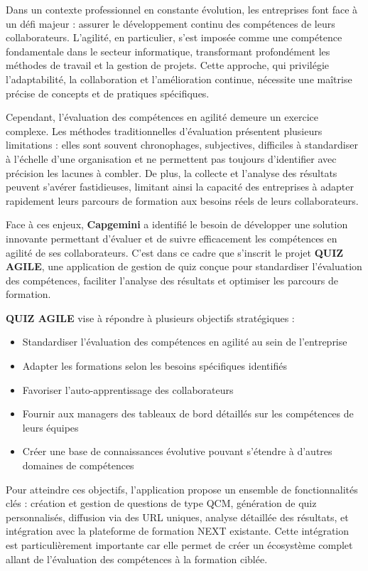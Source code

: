 \documentclass[12pt,a4paper]{report}
\begin{document}
\noindent
Dans un contexte professionnel en constante évolution, les entreprises
font face à un défi majeur : assurer le développement continu des
compétences de leurs collaborateurs. L'agilité, en
particulier, s'est imposée comme une compétence
fondamentale dans le secteur informatique, transformant profondément les
méthodes de travail et la gestion de projets. Cette approche, qui
privilégie l'adaptabilité, la collaboration et
l'amélioration continue, nécessite une maîtrise précise
de concepts et de pratiques spécifiques.

\medskip
\noindent
Cependant, l'évaluation des compétences en agilité
demeure un exercice complexe. Les méthodes traditionnelles
d'évaluation présentent plusieurs limitations : elles
sont souvent chronophages, subjectives, difficiles à standardiser à
l'échelle d'une organisation et ne
permettent pas toujours d'identifier avec précision les
lacunes à combler. De plus, la collecte et l'analyse des
résultats peuvent s'avérer fastidieuses, limitant ainsi
la capacité des entreprises à adapter rapidement leurs parcours de
formation aux besoins réels de leurs collaborateurs.

\medskip
\noindent
Face à ces enjeux, \textbf{Capgemini} a identifié le besoin de
développer une solution innovante permettant d'évaluer
et de suivre efficacement les compétences en agilité de ses
collaborateurs. C'est dans ce cadre que
s'inscrit le projet \textbf{QUIZ AGILE}, une application
de gestion de quiz conçue pour standardiser l'évaluation
des compétences, faciliter l'analyse des résultats et
optimiser les parcours de formation.

\medskip
\noindent
\textbf{QUIZ AGILE} vise à répondre à plusieurs objectifs stratégiques :

\begin{itemize}
    \item Standardiser l'évaluation des compétences en agilité au sein de l'entreprise
    \item Adapter les formations selon les besoins spécifiques identifiés
    \item Favoriser l'auto-apprentissage des collaborateurs
    \item Fournir aux managers des tableaux de bord détaillés sur les compétences de leurs équipes
    \item Créer une base de connaissances évolutive pouvant s'étendre à d'autres domaines de compétences
\end{itemize}

\medskip
\noindent
Pour atteindre ces objectifs, l'application propose un
ensemble de fonctionnalités clés : création et gestion de questions de
type QCM, génération de quiz personnalisés, diffusion via des URL
uniques, analyse détaillée des résultats, et intégration avec la
plateforme de formation NEXT existante. Cette intégration est
particulièrement importante car elle permet de créer un écosystème
complet allant de l'évaluation des compétences à la
formation ciblée.
\end{document}
